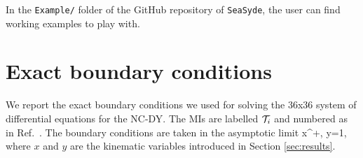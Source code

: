 \documentclass[final,1p,times]{elsarticle}
\begin{document}
In the \texttt{Example/} folder of the GitHub repository of \texttt{SeaSyde}, the user can find working examples to play with.



\section{Exact boundary conditions}
\label{app:exactbcs}
We report the exact boundary conditions we used for solving the 36x36 system of differential equations for the NC-DY. The MIs are labelled $\mathcal{T}_i$ and numbered as in Ref.~\cite{Bonciani:2016ypc}. The boundary conditions are taken in the asymptotic limit 
\be
x^+\;, \qquad y=1,
\ee
where $x$ and $y$ are the kinematic variables introduced in Section \ref{sec:results}. 
\vspace*{3mm}


\vspace*{3mm}
\end{document}
